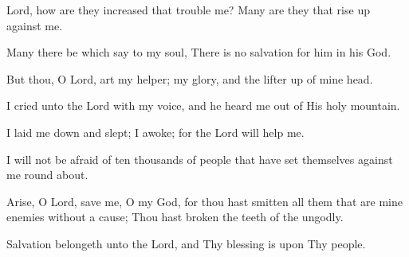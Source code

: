 Lord, how are they increased that trouble me? Many are they that rise up against me.

Many there be which say to my soul, There is no salvation for him in his God.

But thou, O Lord, art my helper; my glory, and the lifter up of mine head.

I cried unto the Lord with my voice, and he heard me out of His holy mountain.

I laid me down and slept; I awoke; for the Lord will help me.

I will not be afraid of ten thousands of people that have set themselves against me round about.

Arise, O Lord, save me, O my God, for thou hast smitten all them that are mine enemies without a cause; Thou hast broken the teeth of the ungodly.

Salvation belongeth unto the Lord, and Thy blessing is upon Thy people.
